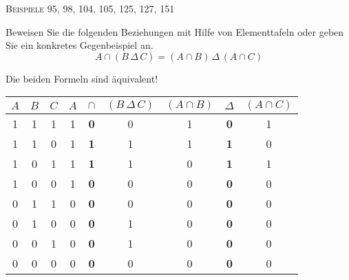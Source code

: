 \documentclass[a4paper, margins=2.5cm]{homework}
\begin{document}
	\begin{center}
    \textsc{Beispiele 95, 98, 104, 105, 125, 127, 151}
  \end{center}

\begin{problem}
	Beweisen Sie die folgenden Beziehungen mit Hilfe von Elementtafeln oder geben
	Sie ein konkretes Gegenbeispiel an.
	\[ A \cap (B\, \Delta \, C) = (A \cap B)\, \Delta \, (A \cap C) \]
\end{problem}
\begin{solution}
	Die beiden Formeln sind äquivalent! \\
	\begin{center}
		\begin{tabular}{|ccc|ccc|ccc|}
			\hline
			$A$ & $B$ & $C$ & $A$ & $\cap$     & $(B\, \Delta \, C)$ & $(A \cap B)$ & $\Delta$   & $(A \cap C)$ \\ \hline
			1   & 1   & 1   & 1   & \textbf{0} & 0                   & 1            & \textbf{0} & 1            \\ \hline
			1   & 1   & 0   & 1   & \textbf{1} & 1                   & 1            & \textbf{1} & 0            \\ \hline
			1   & 0   & 1   & 1   & \textbf{1} & 1                   & 0            & \textbf{1} & 1            \\ \hline
			1   & 0   & 0   & 1   & \textbf{0} & 0                   & 0            & \textbf{0} & 0            \\ \hline
			0   & 1   & 1   & 0   & \textbf{0} & 0                   & 0            & \textbf{0} & 0            \\ \hline
			0   & 1   & 0   & 0   & \textbf{0} & 1                   & 0            & \textbf{0} & 0            \\ \hline
			0   & 0   & 1   & 0   & \textbf{0} & 1                   & 0            & \textbf{0} & 0            \\ \hline
			0   & 0   & 0   & 0   & \textbf{0} & 0                   & 0            & \textbf{0} & 0            \\ \hline
		\end{tabular}
	\end{center}
\end{solution}
\end{document}
